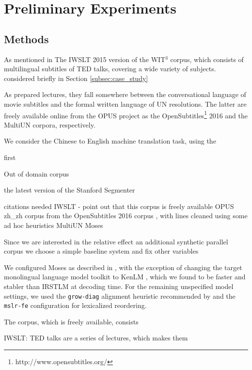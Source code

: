 \section{Preliminary Experiments}
\label{sec:experiments}

\subsection{Methods}
As mentioned in 
The IWSLT 2015 version of the WIT$^3$ corpus, which consists of multilingual subtitles of TED talks, covering a wide variety of subjects. 
considered briefly in Section \ref{subsec:case_study}

As prepared lectures, they fall somewhere between the conversational language of movie subtitles and the formal written language of UN resolutions.
The latter are freely available online from the OPUS project  as the OpenSubtitles\footnote{http://www.opensubtitles.org/} 2016  and the MultiUN  corpora, respectively.

We consider the Chinese to English machine translation task, using the 

first 

Out of domain corpus

the latest version of the Stanford Segmenter 

citations needed
IWSLT  - point out that this corpus is freely available
OPUS 
zh\_zh corpus from the OpenSubtitles 2016 corpus , with lines cleaned using some ad hoc heuristics
MultiUN 
Moses 

Since we are interested in the relative effect an additional synthetic parallel corpus
we choose a simple baseline system and fix other variables

We configured Moses as described in , with the exception of changing the target monolingual language model toolkit to KenLM , which we found to be faster and stabler than IRSTLM  at decoding time.
For the remaining unspecified model settings, we used the {\small \tt grow-diag} alignment heuristic recommended by  and the {\small \tt mslr-fe} configuration for lexicalized reordering.

The corpus, which is freely available, consists 

IWSLT: TED talks are a series of lectures, which makes them 



